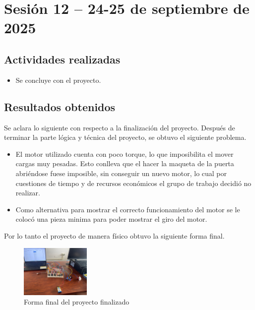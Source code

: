 \documentclass[12pt,letterpaper]{article}
\begin{document}
\section{Sesión 12 -- 24-25 de septiembre de 2025}
\subsection*{Actividades realizadas}
\begin{itemize}
    \item Se concluye con el proyecto.
\end{itemize}

\subsection*{Resultados obtenidos}
Se aclara lo siguiente con respecto a la finalización del proyecto. Después de terminar la parte lógica y técnica del proyecto, se obtuvo el siguiente problema. 
\begin{itemize}
    \item El motor utilizado cuenta con poco torque, lo que imposibilita el mover cargas muy pesadas. Esto conlleva que el hacer la maqueta de la puerta abriéndose fuese imposible, sin conseguir un nuevo motor, lo cual por cuestiones de tiempo y de recursos económicos el grupo de trabajo decidió no realizar.
    \item Como alternativa para mostrar el correcto funcionamiento del motor se le colocó una pieza minima para poder mostrar el giro del motor.
\end{itemize}
Por lo tanto el proyecto de manera físico obtuvo la siguiente forma final.
\begin{figure}[H]
    \centering
    \includegraphics[width=0.3\textwidth]{images/final_pp.jpg} %
    \caption{Forma final del proyecto finalizado}
    \label{fig:CONCLU}
\end{figure}
\end{document}
